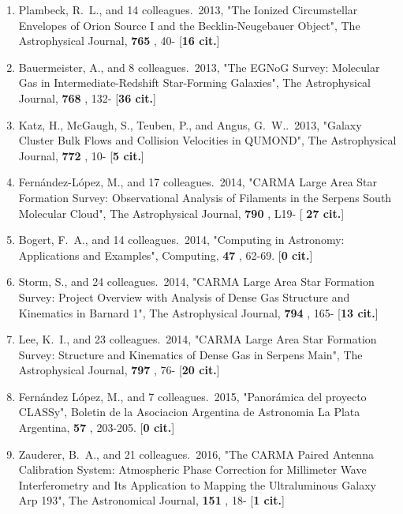 \documentclass[11pt,letterpaper]{article}
\begin{document}
\begin{enumerate}[resume,label=\textbf{\arabic*}.]
\item  
Plambeck, R.~L., and 14 colleagues.\  2013,  "The Ionized Circumstellar 
Envelopes of Orion Source I and the Becklin-Neugebauer Object", The 
Astrophysical Journal,  {\bf 765} , 40- [{\bf 16 cit.}] 

\item  
Bauermeister, A., and 8 colleagues.\  2013,  "The EGNoG Survey: Molecular 
Gas in Intermediate-Redshift Star-Forming Galaxies", The Astrophysical 
Journal,  {\bf 768} , 132- [{\bf 36 cit.}] 

\item  
Katz, H., McGaugh, S., Teuben, P., and Angus, G.~W..\  2013,  "Galaxy 
Cluster Bulk Flows and Collision Velocities in QUMOND", The Astrophysical 
Journal,  {\bf 772} , 10- [{\bf 5 cit.}] 

\item  
Fern{\'a}ndez-L{\'o}pez, M., and 17 colleagues.\  2014,  "CARMA Large Area 
Star Formation Survey: Observational Analysis of Filaments in the Serpens 
South Molecular Cloud", The Astrophysical Journal,  {\bf 790} , L19- [{\bf 
27 cit.}] 

\item  
Bogert, F.~A., and 14 colleagues.\  2014,  "Computing in Astronomy: 
Applications and Examples", Computing,  {\bf 47} , 62-69.  [{\bf 0 cit.}] 

\item  
Storm, S., and 24 colleagues.\  2014,  "CARMA Large Area Star Formation 
Survey: Project Overview with Analysis of Dense Gas Structure and 
Kinematics in Barnard 1", The Astrophysical Journal,  {\bf 794} , 165- 
[{\bf 13 cit.}] 

\item  
Lee, K.~I., and 23 colleagues.\  2014,  "CARMA Large Area Star Formation 
Survey: Structure and Kinematics of Dense Gas in Serpens Main", The 
Astrophysical Journal,  {\bf 797} , 76- [{\bf 20 cit.}] 

\item  
Fern{\'a}ndez L{\'o}pez, M., and 7 colleagues.\  2015,  "Panor{\'a}mica del 
proyecto CLASSy", Boletin de la Asociacion Argentina de Astronomia La Plata 
Argentina,  {\bf 57} , 203-205.  [{\bf 0 cit.}] 

\item  
Zauderer, B.~A., and 21 colleagues.\  2016,  "The CARMA Paired Antenna 
Calibration System: Atmospheric Phase Correction for Millimeter Wave 
Interferometry and Its Application to Mapping the Ultraluminous Galaxy Arp 
193", The Astronomical Journal,  {\bf 151} , 18- [{\bf 1 cit.}] 


\end{enumerate}
\end{document}
